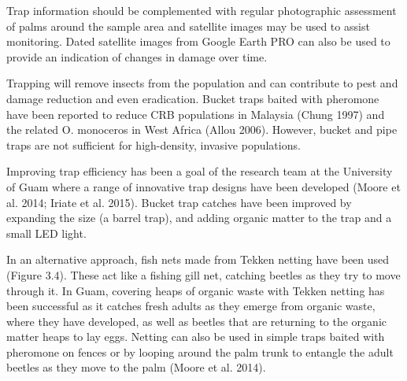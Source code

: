 \documentclass[twocolumn,letterpaper]{scrartcl}
\begin{document}
Trap information should be complemented with regular photographic assessment of palms around the sample 
area and satellite images may be used to assist monitoring. Dated satellite images from Google Earth PRO can 
also be used to provide an indication of changes in damage over time.

Trapping will remove insects from the population and can contribute to pest and damage reduction and even 
eradication. Bucket traps baited with pheromone have been reported to reduce CRB populations in Malaysia 
(Chung 1997) and the related O. monoceros in West Africa (Allou 2006). However, bucket and pipe traps are not 
sufficient for high-density, invasive populations. 

Improving trap efficiency has been a goal of the research team at the University of Guam where a range of 
innovative trap designs have been developed (Moore et al. 2014; Iriate et al. 2015). Bucket trap catches have 
been improved by expanding the size (a barrel trap), and adding organic matter to the trap and a small LED 
light. 

In an alternative approach, fish nets made from Tekken netting have been used (Figure 3.4). These act like 
a fishing gill net, catching beetles as they try to move through it. In Guam, covering heaps of organic waste with 
Tekken netting has been successful as it catches fresh adults as they emerge from organic waste, where they 
have developed, as well as beetles that are returning to the organic matter heaps to lay eggs. Netting can also 
be used in simple traps baited with pheromone on fences or by looping around the palm trunk to entangle the 
adult beetles as they move to the palm (Moore et al. 2014).
\end{document}
